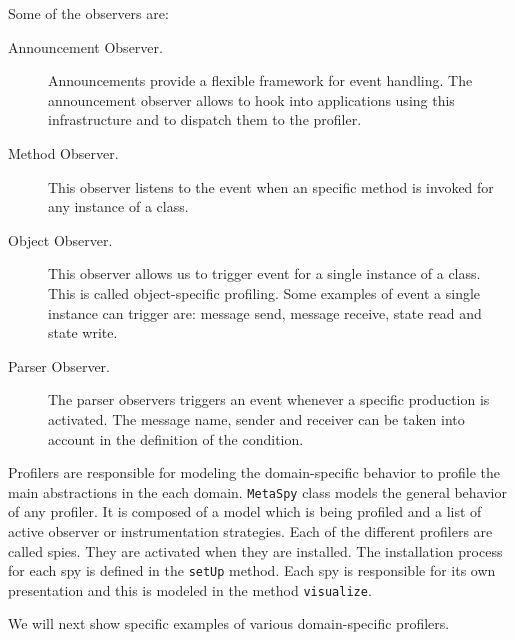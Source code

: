 \documentclass[runningheads]{llncs}
\newcommand{\ct}{\lstinline[backgroundcolor=\color{white},basicstyle=\footnotesize\ttfamily]}
\newcommand{\lr}[1]{\nb{Lukas}{orange}{#1}}
\begin{document}
Some of the observers are:
\begin{description}
	\item[Announcement Observer.] Announcements provide a flexible framework for event handling. The announcement observer allows to hook into applications using this infrastructure and to dispatch them to the profiler.
	\item[Method Observer.] This observer listens to the event when an specific method is invoked for any instance of a class.
	\item[Object Observer.] This observer allows us to trigger event for a single instance of a class. This is called object-specific profiling. Some examples of event a single instance can trigger are: message send, message receive, state read and state write.
	\item[Parser Observer.] The parser observers triggers an event whenever a specific production is activated.
	The message name, sender and receiver can be taken into account in the definition of the condition. 
\end{description}

Profilers are responsible for modeling the domain-specific behavior to profile the main abstractions in the each domain.
\ct{MetaSpy} class models the general behavior of any profiler. It is composed of a model which is being profiled and a list of active observer or instrumentation strategies.
Each of the different profilers are called spies. They are activated when they are installed. The installation process for each spy is defined in the \ct{setUp} method.
Each spy is responsible for its own presentation and this is modeled in the method \ct{visualize}.

We will next show specific examples of various domain-specific profilers.

\end{document}
